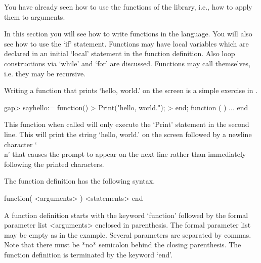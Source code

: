 


You have  already seen how to  use the functions   of the {\GAP} library,
i.e., how to apply them to arguments.

In  this section  you will  see  how  to write  functions  in the  {\GAP}
language.  You will also see  how to use  the `if' statement.   Functions
may  have  local variables   which are  declared   in an  initial `local'
statement in the function definition. Also loop constructions via
`while' and `for' are discussed. Functions may call themselves, i.e. they
may be recursive.


Writing a function that prints `hello, world.'  on the screen is a simple
exercise in {\GAP}.

\beginexample
gap> sayhello:= function()
> Print("hello, world.\n");
> end;
function (  ) ... end
\endexample

This function when called will only execute the  `Print' statement in the
second line.  This will  print the string  `hello, world.'  on the screen
followed by a  newline character `\\n' that causes  the {\GAP} prompt  to
appear  on the next  line rather  than  immediately following the printed
characters.

The function definition has the following syntax.

\)\fmark function( <arguments> ) <statements> end

A function definition starts with the keyword `function' followed  by the
formal  parameter list <arguments> enclosed  in  parenthesis.  The formal
parameter list  may be empty as in  the example.  Several  parameters are
separated by commas.  Note that there  must be  *no* semicolon behind the
closing   parenthesis.   The  function  definition  is  terminated by the
keyword `end'.

